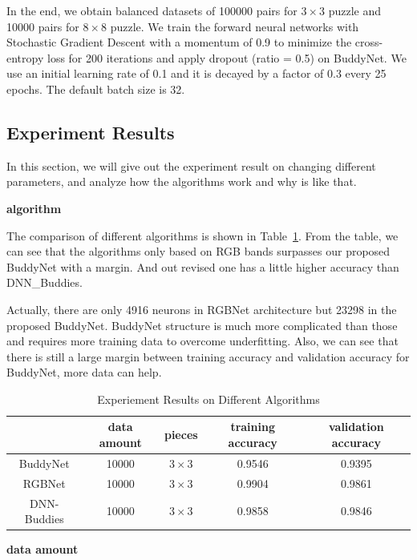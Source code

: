 \documentclass{article}
\begin{document}
In the end, we obtain balanced datasets of 100000 pairs for $3\times 3$ puzzle and 10000 pairs for  $8\times 8$ puzzle. We train the forward neural networks with Stochastic Gradient Descent with a momentum of 0.9 to minimize the cross-entropy loss for 200 iterations and apply dropout (ratio = 0.5) on BuddyNet. We use an initial learning rate of 0.1 and it is decayed by a factor of 0.3 every 25 epochs. The default batch size is 32.

\subsection{Experiment Results}

In this section, we will give out the experiment result on changing different parameters, and analyze how the algorithms work and why is like that.

\textbf{algorithm}

The comparison of different algorithms is shown in Table~\ref{tab:expalg}. From the table, we can see that the algorithms only based on RGB bands surpasses our proposed BuddyNet with a margin. And out revised one has a little higher accuracy than DNN\_Buddies\cite{sholomon2016dnn}.

Actually, there are only 4916 neurons in RGBNet architecture but 23298 in the proposed BuddyNet. BuddyNet structure is much more complicated than those and requires more training data to overcome underfitting. Also, we can see that there is still a large margin between training accuracy and validation accuracy for BuddyNet, more data can help.

\begin{table}
    \caption{Experiement Results on Different Algorithms}
    \centering
    \label{tab:expalg}
    \begin{tabular}{c|c|c|c|c}
        \hline
        & data amount & pieces & training accuracy & validation accuracy\\
        \hline
        BuddyNet & 10000 & $3\times 3$ & 0.9546 & 0.9395\\
        \hline
        RGBNet & 10000 & $3\times 3$ & 0.9904 & 0.9861\\
        \hline
        \hline
        DNN-Buddies \cite{sholomon2016dnn} & 10000 & $3\times 3$ & 0.9858 & 0.9846\\
        \hline
    \end{tabular}
\end{table}

\textbf{data amount}
\end{document}
